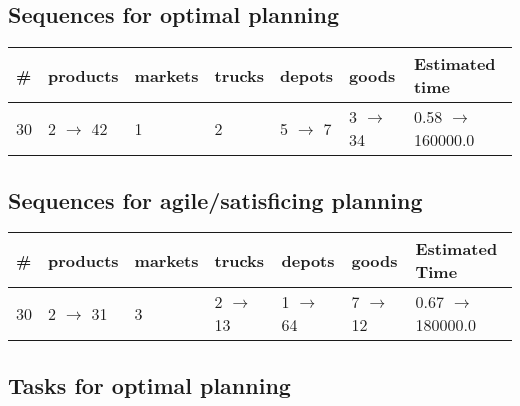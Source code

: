 \documentclass{article}
\begin{document}
                            \subsection*{Sequences for optimal planning}

                            \begin{center}
                            \begin{tabular}{@{}l|l|l|l|l|l|l@{}}
                            \# & products & markets & trucks & depots & goods & Estimated time\\\midrule
                            30&2 $\rightarrow$ 42&1&2&5 $\rightarrow$ 7&3 $\rightarrow$ 34&0.58 $\rightarrow$ 160000.0
                            \end{tabular}
                            \end{center}
                    
                         \subsection*{Sequences for agile/satisficing planning}

                        \begin{center}
                        \begin{tabular}{@{}l|l|l|l|l|l|l@{}}
                        \# & products & markets & trucks & depots & goods & Estimated Time\\\midrule
                        30&2 $\rightarrow$ 31&3&2 $\rightarrow$ 13&1 $\rightarrow$ 64&7 $\rightarrow$ 12&0.67 $\rightarrow$ 180000.0
                        \end{tabular}
                        \end{center}
                    
                                \subsection*{Tasks for optimal planning}
                                
\end{document}
